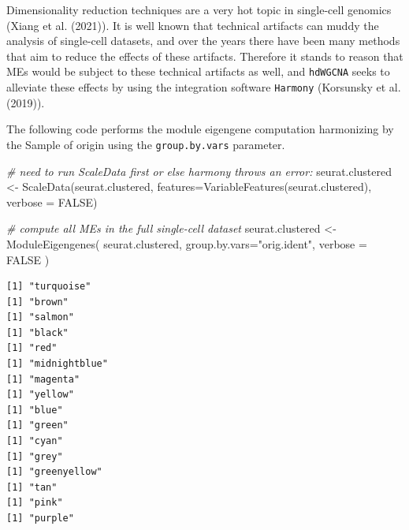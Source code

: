 \documentclass[
  letterpaper,
  DIV=11,
  numbers=noendperiod]{scrartcl}
\newenvironment{Shaded}{\begin{snugshade}}{\end{snugshade}}
\newcommand{\AttributeTok}[1]{\textcolor[rgb]{0.49,0.56,0.16}{#1}}
\newcommand{\CommentTok}[1]{\textcolor[rgb]{0.38,0.63,0.69}{\textit{#1}}}
\newcommand{\ConstantTok}[1]{\textcolor[rgb]{0.53,0.00,0.00}{#1}}
\newcommand{\FunctionTok}[1]{\textcolor[rgb]{0.02,0.16,0.49}{#1}}
\newcommand{\NormalTok}[1]{\textcolor[rgb]{0.00,0.44,0.13}{#1}}
\newcommand{\OtherTok}[1]{\textcolor[rgb]{0.00,0.44,0.13}{#1}}
\newcommand{\StringTok}[1]{\textcolor[rgb]{0.25,0.44,0.63}{#1}}
\begin{document}
Dimensionality reduction techniques are a very hot topic in single-cell
genomics (Xiang et al. (2021)). It is well known that technical
artifacts can muddy the analysis of single-cell datasets, and over the
years there have been many methods that aim to reduce the effects of
these artifacts. Therefore it stands to reason that MEs would be subject
to these technical artifacts as well, and \texttt{hdWGCNA} seeks to
alleviate these effects by using the integration software
\texttt{Harmony} (Korsunsky et al. (2019)).

The following code performs the module eigengene computation harmonizing
by the Sample of origin using the \texttt{group.by.vars} parameter.

\begin{Shaded}
\begin{Highlighting}[]
\CommentTok{\# need to run ScaleData first or else harmony throws an error:}
\NormalTok{seurat.clustered }\OtherTok{\textless{}{-}} \FunctionTok{ScaleData}\NormalTok{(seurat.clustered, }
                              \AttributeTok{features=}\FunctionTok{VariableFeatures}\NormalTok{(seurat.clustered), }
                              \AttributeTok{verbose =} \ConstantTok{FALSE}\NormalTok{)}
\end{Highlighting}
\end{Shaded}

\begin{Shaded}
\begin{Highlighting}[]
\CommentTok{\# compute all MEs in the full single{-}cell dataset}
\NormalTok{seurat.clustered }\OtherTok{\textless{}{-}} \FunctionTok{ModuleEigengenes}\NormalTok{( }
\NormalTok{ seurat.clustered,}
 \AttributeTok{group.by.vars=}\StringTok{"orig.ident"}\NormalTok{,}
 \AttributeTok{verbose =} \ConstantTok{FALSE}
\NormalTok{)}
\end{Highlighting}
\end{Shaded}

\begin{verbatim}
[1] "turquoise"
[1] "brown"
[1] "salmon"
[1] "black"
[1] "red"
[1] "midnightblue"
[1] "magenta"
[1] "yellow"
[1] "blue"
[1] "green"
[1] "cyan"
[1] "grey"
[1] "greenyellow"
[1] "tan"
[1] "pink"
[1] "purple"
\end{verbatim}
\end{document}
